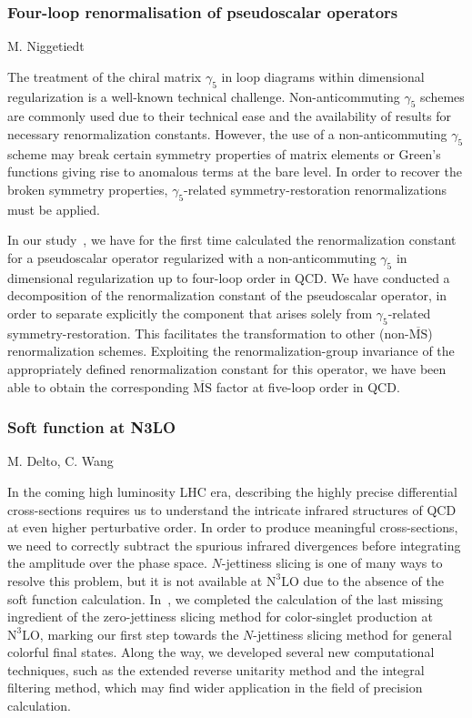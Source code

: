 \documentclass{FBR_Bericht_2025}
\begin{document}
\begin{refsection}
%
\subsubsection{Four-loop renormalisation of pseudoscalar operators}
\begin{Namen}
M. Niggetiedt
\end{Namen}
%
The treatment of the chiral matrix $\gamma_5$ in loop diagrams within dimensional regularization is a well-known technical challenge. Non-anticommuting $\gamma_5$ schemes are commonly used due to their technical ease and the availability of results for necessary renormalization constants. However, the use of a non-anticommuting $\gamma_5$ scheme may break certain symmetry properties of matrix elements or Green's functions giving rise to anomalous terms at the bare level. In order to recover the broken symmetry properties, $\gamma_5$-related symmetry-restoration renormalizations must be applied. 

In our study~\cite{Chen:2024cvu}, we have for the first time calculated the renormalization constant for a pseudoscalar operator regularized with a non-anticommuting $\gamma_5$ in dimensional regularization up to four-loop order in QCD. We have conducted a decomposition of the renormalization constant of the pseudoscalar operator, in order to separate explicitly the component that arises solely from $\gamma_5$-related symmetry-restoration. This facilitates the transformation to other (non-$\overline{\mathrm{MS}}$) renormalization schemes. Exploiting the renormalization-group invariance of the appropriately defined renormalization constant for this operator, we have been able to obtain the corresponding $\overline{\mathrm{MS}}$ factor at five-loop order in QCD. 
%
\subsubsection{Soft function at N3LO}
\begin{Namen}
M. Delto, C. Wang
\end{Namen}
%
In the coming high luminosity LHC era, describing the highly precise differential cross-sections requires us to understand the intricate infrared structures of QCD at even higher perturbative order.
In order to produce meaningful cross-sections, we need to correctly subtract the spurious infrared divergences before integrating the amplitude over the phase space.
$N$-jettiness slicing is one of many ways to resolve this problem, but it is not available at $\text{N}^{3}\text{LO}$ due to the absence of the soft function calculation.
In~\cite{Baranowski:2024ene,Baranowski:2024vxg,Baranowski:2024ysi}, we completed the calculation of the last missing ingredient of the zero-jettiness slicing method for color-singlet production at $\text{N}^{3}\text{LO}$, marking our first step towards the $N$-jettiness slicing method for general colorful final states.
Along the way, we developed several new computational techniques, such as the extended reverse unitarity method and the integral filtering method, which may find wider application in the field of precision calculation.
%

\end{refsection}
\end{document}
